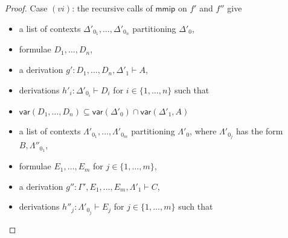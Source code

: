 \documentclass[a4paper,UKenglish,cleveref,autoref,thm-restate, anonymous]{lipics-v2021}
\newcommand{\Rarr}{\Rightarrow}
\newcommand{\mf}[1]{\mathsf{#1}}
\newcommand{\vars}[1]{\mf{var} (#1)}
\newcommand{\GG}{\Gamma}
\newcommand{\GD}{\Delta}
\newcommand{\GL}{\Lambda}
\newcommand{\vd}{\vdash}
\begin{document}
\begin{proof}
  Case $(vi)$: %
  the recursive calls of $\mf{mmip}$ on $f'$ and $f''$ give
  \begin{itemize}
  \item a list of contexts $\GD'_{0_1}, \dots , \GD'_{0_n}$ partitioning $\GD'_0$,
  \item formulae $D_1,\dots,D_n$,
  \item a derivation $g' : D_1,\dots,D_n , \GD'_1 \vd A$,
  \item derivations $h'_i : \GD'_{0_i} \vdash D_i$ for $i \in \{1,\dots,n\}$ such that
  \item $\vars{D_1 , \dots, D_n} \subseteq \vars{\GD'_0} \cap \vars{\GD'_1, A}$
  \end{itemize}
  \begin{itemize}
  \item a list of contexts $\GL'_{0_1}, \dots , \GL'_{0_m}$ partitioning $\GL'_0$, where $\GL'_{0_j}$ has the form $B , \GL''_{0_1}$,
  \item formulae $E_1,\dots,E_m$ for $j\in\{1,\dots,m\}$,
  \item a derivation $g'' : \GG' , E_1,\dots,E_m, \GL'_1 \vd C$,
  \item derivations $h''_j : \GL'_{0_j} \vdash E_j$ for $j \in \{1,\dots,m\}$ such that

\end{itemize}
\end{proof}
\end{document}
